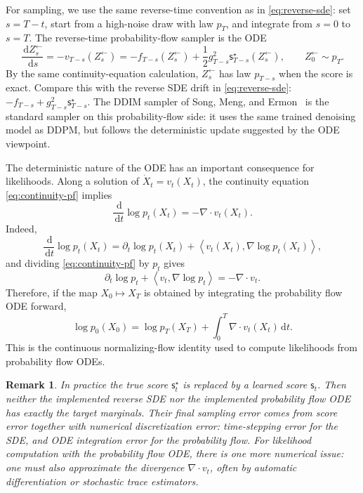 \documentclass[10pt,a4paper]{amsart}
\numberwithin{equation}{section}
\newtheorem*{remark}{Remark}
\newcommand{\dd}{\,\mathrm{d}}
\newcommand{\ip}[2]{\left\langle #1,#2 \right\rangle}
\newcommand{\sstar}{\mathsf{s}^{\star}}
\newcommand{\score}{\mathsf{s}}
\begin{document}
For sampling, we use the same reverse-time convention as in
\eqref{eq:reverse-sde}: set $s=T-t$, start from a high-noise draw with law
$p_T$, and integrate from $s=0$ to $s=T$.  The reverse-time probability-flow
sampler is the ODE
\[
    \frac{\dd Z^{\leftarrow}_s}{\dd s}
    =
    -v_{T-s}(Z^{\leftarrow}_s)
    =
    -f_{T-s}(Z^{\leftarrow}_s)
    +\frac12 g_{T-s}^2\sstar_{T-s}(Z^{\leftarrow}_s),
    \qquad Z^{\leftarrow}_0\sim p_T.
\]
By the same continuity-equation calculation, $Z^{\leftarrow}_s$ has law $p_{T-s}$
when the score is exact.
Compare this with the reverse SDE drift in \eqref{eq:reverse-sde}: $ -f_{T-s}+g_{T-s}^2\sstar_{T-s}$.
The DDIM sampler of Song, Meng, and Ermon~\cite{song2021ddim} is the
standard sampler on this probability-flow side: it uses the same trained
denoising model as DDPM, but follows the deterministic update suggested by the
ODE viewpoint.

The deterministic nature of the ODE has an important consequence for
likelihoods.  Along a solution of $\dot X_t=v_t(X_t)$, the continuity equation
\eqref{eq:continuity-pf} implies
\begin{equation}\label{eq:instantaneous-change}
    \frac{\dd}{\dd t}\log p_t(X_t)
    =
    -\nabla\cdot v_t(X_t).
\end{equation}
Indeed,
\[
    \frac{\dd}{\dd t}\log p_t(X_t)
    =
    \partial_t\log p_t(X_t)+
    \ip{v_t(X_t)}{\nabla\log p_t(X_t)},
\]
and dividing \eqref{eq:continuity-pf} by $p_t$ gives
\[
    \partial_t\log p_t+\ip{v_t}{\nabla\log p_t}
    =
    -\nabla\cdot v_t.
\]
Therefore, if the map $X_0\mapsto X_T$ is obtained by integrating the
probability flow ODE forward,
\[
    \log p_0(X_0)
    =
    \log p_T(X_T)
    +
    \int_0^T \nabla\cdot v_t(X_t)\dd t.
\]
This is the continuous normalizing-flow identity used to compute likelihoods
from probability flow ODEs.


\begin{remark}
In practice the true score $\sstar_t$ is replaced by a learned score
$\score_t$.  Then neither the implemented reverse SDE nor the implemented
probability flow ODE has exactly the target marginals.  Their final sampling
error comes from score error together with numerical discretization error:
time-stepping error for the SDE, and ODE integration error for the probability
flow.  For likelihood computation with the probability flow ODE, there is one
more numerical issue: one must also approximate the divergence
$\nabla\cdot v_t$, often by automatic differentiation or stochastic trace
estimators.
\end{remark}
\end{document}

